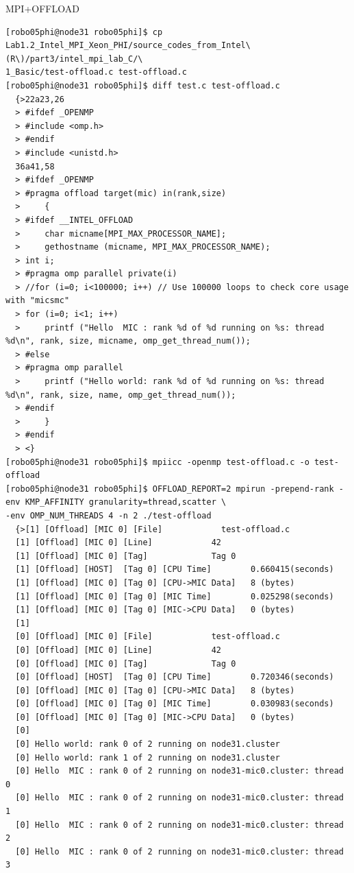\documentclass[pscyr,10pt]{hedlab}
\begin{document}
  \begin{center}
    MPI+OFFLOAD
  \end{center}

\begin{lstlisting}
[robo05phi@node31 robo05phi]$ cp Lab1.2_Intel_MPI_Xeon_PHI/source_codes_from_Intel\(R\)/part3/intel_mpi_lab_C/\
1_Basic/test-offload.c test-offload.c
[robo05phi@node31 robo05phi]$ diff test.c test-offload.c
  {>22a23,26
  > #ifdef _OPENMP
  > #include <omp.h>
  > #endif
  > #include <unistd.h>
  36a41,58
  > #ifdef _OPENMP
  > #pragma offload target(mic) in(rank,size)
  >     {
  > #ifdef __INTEL_OFFLOAD
  > 	char micname[MPI_MAX_PROCESSOR_NAME];
  > 	gethostname (micname, MPI_MAX_PROCESSOR_NAME);
  > int i;
  > #pragma omp parallel private(i)
  > //for (i=0; i<100000; i++) // Use 100000 loops to check core usage with "micsmc"
  > for (i=0; i<1; i++) 
  > 	printf ("Hello  MIC : rank %d of %d running on %s: thread %d\n", rank, size, micname, omp_get_thread_num());
  > #else
  > #pragma omp parallel
  > 	printf ("Hello world: rank %d of %d running on %s: thread %d\n", rank, size, name, omp_get_thread_num());
  > #endif
  >     }
  > #endif
  > <}
[robo05phi@node31 robo05phi]$ mpiicc -openmp test-offload.c -o test-offload
[robo05phi@node31 robo05phi]$ OFFLOAD_REPORT=2 mpirun -prepend-rank -env KMP_AFFINITY granularity=thread,scatter \
-env OMP_NUM_THREADS 4 -n 2 ./test-offload
  {>[1] [Offload] [MIC 0] [File]            test-offload.c
  [1] [Offload] [MIC 0] [Line]            42
  [1] [Offload] [MIC 0] [Tag]             Tag 0
  [1] [Offload] [HOST]  [Tag 0] [CPU Time]        0.660415(seconds)
  [1] [Offload] [MIC 0] [Tag 0] [CPU->MIC Data]   8 (bytes)
  [1] [Offload] [MIC 0] [Tag 0] [MIC Time]        0.025298(seconds)
  [1] [Offload] [MIC 0] [Tag 0] [MIC->CPU Data]   0 (bytes)
  [1] 
  [0] [Offload] [MIC 0] [File]            test-offload.c
  [0] [Offload] [MIC 0] [Line]            42
  [0] [Offload] [MIC 0] [Tag]             Tag 0
  [0] [Offload] [HOST]  [Tag 0] [CPU Time]        0.720346(seconds)
  [0] [Offload] [MIC 0] [Tag 0] [CPU->MIC Data]   8 (bytes)
  [0] [Offload] [MIC 0] [Tag 0] [MIC Time]        0.030983(seconds)
  [0] [Offload] [MIC 0] [Tag 0] [MIC->CPU Data]   0 (bytes)
  [0] 
  [0] Hello world: rank 0 of 2 running on node31.cluster
  [0] Hello world: rank 1 of 2 running on node31.cluster
  [0] Hello  MIC : rank 0 of 2 running on node31-mic0.cluster: thread 0
  [0] Hello  MIC : rank 0 of 2 running on node31-mic0.cluster: thread 1
  [0] Hello  MIC : rank 0 of 2 running on node31-mic0.cluster: thread 2
  [0] Hello  MIC : rank 0 of 2 running on node31-mic0.cluster: thread 3

\end{lstlisting}
\end{document}
